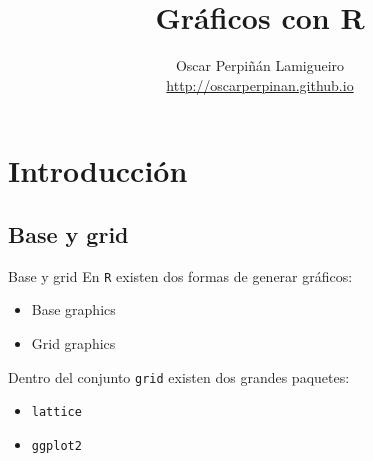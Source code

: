 \documentclass[xcolor={usenames,svgnames,dvipsnames}]{beamer}
\author{Oscar Perpiñán Lamigueiro \\ \url{http://oscarperpinan.github.io}}
\date{}
\title{Gráficos con R}
\begin{document}
\maketitle


\section{Introducción}
\label{sec-1}
\subsection{Base y grid}
\label{sec-1-1}
\begin{frame}[fragile,label=sec-1-1-1]{Base y grid}
 En \texttt{R} existen dos formas de generar gráficos:
\begin{itemize}
\item Base graphics
\item Grid graphics
\end{itemize}

Dentro del conjunto \texttt{grid} existen dos grandes paquetes:
\begin{itemize}
\item \texttt{lattice}
\item \texttt{ggplot2}
\end{itemize}
\end{frame}
\end{document}
